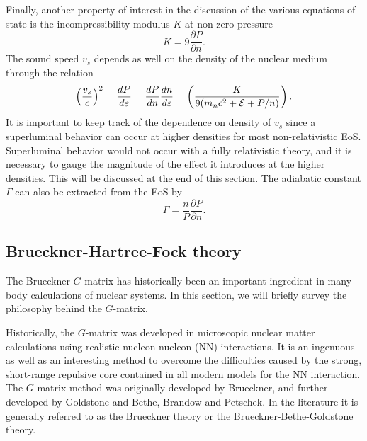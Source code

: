 \documentclass[%
oneside,                 %
final,                   %
10pt]{article}
\begin{document}
Finally, another property of interest in the discussion of the various 
equations of state  
is the incompressibility modulus $K$ at non-zero pressure
\begin{equation}
    K=9\frac{\partial P}{\partial n}.
    \label{eq:incompressibility}
\end{equation}
The sound speed $v_s$ depends as well on the density
of the nuclear medium through the relation
\begin{equation}
    \left(\frac{v_s}{c}\right)^2=\frac{dP}{d\varepsilon}=
    \frac{dP}{dn}\frac{dn}{d\varepsilon}=
    \left(\frac{K}{9(m_nc^2+{\cal E}+P/n)}\right).
    \label{eq:speedofsound}
\end{equation}
It is important to keep track of the dependence on density of $v_s$
since a superluminal behavior can occur at higher densities for most
non-relativistic EoS.
Superluminal behavior would
not occur with a fully relativistic theory, and it is necessary to
gauge the magnitude of the effect it introduces at the higher densities.
This will be discussed at the end of this section.
The adiabatic constant $\Gamma$ can also be extracted from the EoS
by 
\begin{equation}
    \Gamma = \frac{n}{P}\frac{\partial P}{\partial n}.
    \label{eq:adiabaticconstant}
\end{equation}





\subsection{Brueckner-Hartree-Fock theory}


The Brueckner $G$-matrix has historically been an important ingredient
in many-body calculations of nuclear systems. In this section, we will
briefly survey the philosophy behind the $G$-matrix.

Historically, the $G$-matrix was developed in microscopic nuclear
matter calculations using realistic nucleon-nucleon (NN) interactions.
It is an ingenuous as well as an interesting method to overcome the
difficulties caused by the strong, short-range repulsive core contained
in all modern models for the NN interaction. The $G$-matrix method was
originally developed by Brueckner, and further
developed by Goldstone and Bethe, Brandow and Petschek. 
In the literature it is generally referred to as the
Brueckner theory or the Brueckner-Bethe-Goldstone theory.
\end{document}
